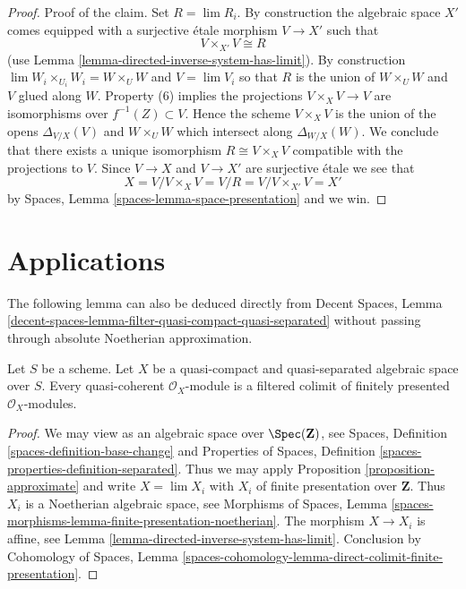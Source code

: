 \begin{proof}
\medskip\noindent
Proof of the claim. Set $R = \lim R_i$.
By construction the algebraic space $X'$ comes
equipped with a surjective \'etale morphism $V \to X'$ such that
$$
V \times_{X'} V \cong R
$$
(use Lemma \ref{lemma-directed-inverse-system-has-limit}).
By construction $\lim W_i \times_{U_i} W_i = W \times_U W$ and $V = \lim V_i$
so that $R$ is the union of $W \times_U W$ and $V$ glued along $W$.
Property (6) implies the projections $V \times_X V \to V$ are isomorphisms
over $f^{-1}(Z) \subset V$. Hence the scheme $V \times_X V$ is the union
of the opens $\Delta_{V/X}(V)$ and $W \times_U W$ which intersect
along $\Delta_{W/X}(W)$. We conclude that there exists a unique isomorphism
$R \cong V \times_X V$ compatible with the projections to $V$.
Since $V \to X$ and $V \to X'$ are surjective \'etale we see that
$$
X = V/ V \times_X V = V/R = V/V \times_{X'} V = X'
$$
by Spaces, Lemma \ref{spaces-lemma-space-presentation} and we win.
\end{proof}




\section{Applications}
\label{section-applications}

\noindent
The following lemma can also be deduced directly from
Decent Spaces, Lemma
\ref{decent-spaces-lemma-filter-quasi-compact-quasi-separated}
without passing through absolute Noetherian approximation.

\begin{lemma}
\label{lemma-colimit-finitely-presented}
Let $S$ be a scheme. Let $X$ be a quasi-compact and quasi-separated algebraic
space over $S$. Every quasi-coherent $\mathcal{O}_X$-module is a
filtered colimit of finitely presented $\mathcal{O}_X$-modules.
\end{lemma}

\begin{proof}
We may view as an algebraic space over $\Spec(\mathbf{Z})$, see
Spaces, Definition \ref{spaces-definition-base-change} and
Properties of Spaces, Definition \ref{spaces-properties-definition-separated}.
Thus we may apply Proposition \ref{proposition-approximate}
and write $X = \lim X_i$ with $X_i$ of finite presentation over $\mathbf{Z}$.
Thus $X_i$ is a Noetherian algebraic space, see
Morphisms of Spaces, Lemma
\ref{spaces-morphisms-lemma-finite-presentation-noetherian}.
The morphism $X \to X_i$ is affine, see
Lemma \ref{lemma-directed-inverse-system-has-limit}.
Conclusion by
Cohomology of Spaces, Lemma
\ref{spaces-cohomology-lemma-direct-colimit-finite-presentation}.
\end{proof}

